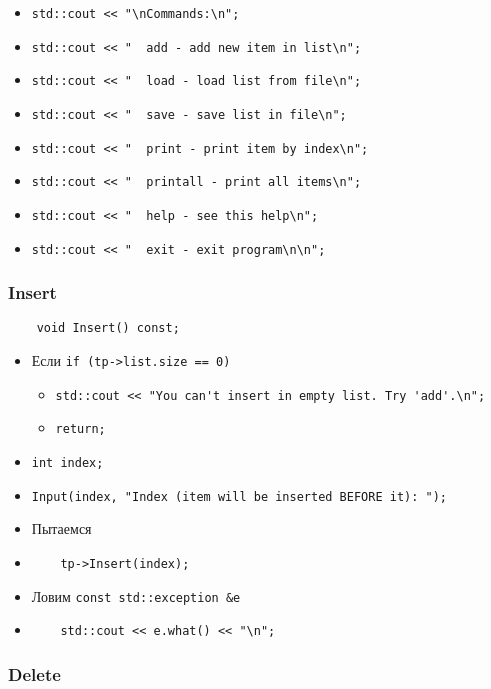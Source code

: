 \begin{itemize}
	\item \verb|std::cout << "\nCommands:\n";|
    \item \verb|std::cout << "  add - add new item in list\n";|
    \item \verb|std::cout << "  load - load list from file\n";|
    \item \verb|std::cout << "  save - save list in file\n";|
    \item \verb|std::cout << "  print - print item by index\n";|
    \item \verb|std::cout << "  printall - print all items\n";|
    \item \verb|std::cout << "  help - see this help\n";|
    \item \verb|std::cout << "  exit - exit program\n\n";|
\end{itemize}


\subsubsection*{Insert}

\begin{lstlisting}
    void Insert() const;
\end{lstlisting}

\begin{itemize}
	\item Если \verb|if (tp->list.size == 0)|
		\begin{itemize}
			\item \verb|std::cout << "You can't insert in empty list. Try 'add'.\n";|
			\item \verb|return;|
		\end{itemize}
    \item \verb|int index;|
    \item \verb|Input(index, "Index (item will be inserted BEFORE it): ");|
    \item Пытаемся
    \item \verb|    tp->Insert(index);|
    \item Ловим \verb|const std::exception &e|
    \item \verb|    std::cout << e.what() << "\n";|
\end{itemize}



\subsubsection*{Delete}

